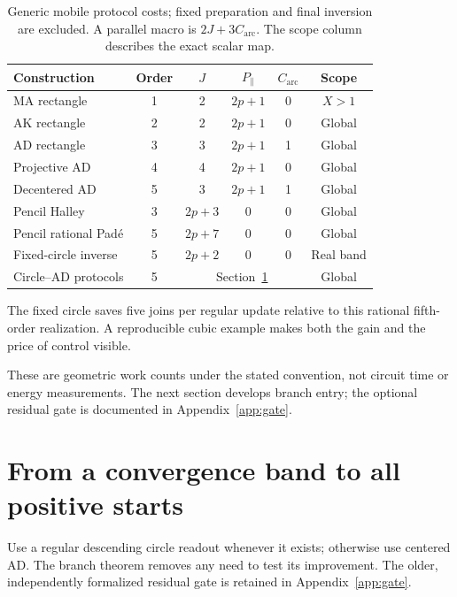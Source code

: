 \documentclass[11pt,a4paper]{article}
\begin{document}
\begin{table}[H]\centering\small
\caption{Generic mobile protocol costs; fixed preparation and final inversion are excluded. A parallel macro is $2J+3C_{\mathrm{arc}}$. The scope column describes the exact scalar map.}
\begin{tabularx}{\linewidth}{@{}Xccccc@{}}\toprule
Construction & Order & $J$ & $P_{\parallel}$ & $C_{\mathrm{arc}}$ & Scope\\\midrule
MA rectangle & 1 & 2 & $2p+1$ & 0 & $X>1$\\
AK rectangle & 2 & 2 & $2p+1$ & 0 & Global\\
AD rectangle & 3 & 3 & $2p+1$ & 1 & Global\\
Projective AD & 4 & 4 & $2p+1$ & 0 & Global\\
Decentered AD & 5 & 3 & $2p+1$ & 1 & Global\\
Pencil Halley & 3 & $2p+3$ & 0 & 0 & Global\\
Pencil rational Pad\'e & 5 & $2p+7$ & 0 & 0 & Global\\
Fixed-circle inverse & 5 & $2p+2$ & 0 & 0 & Real band\\
Circle--AD protocols & 5 & \multicolumn{3}{c}{Section~\ref{sec:safeguard}} & Global\\\bottomrule
\end{tabularx}
\end{table}
The fixed circle saves five joins per regular update relative to this rational fifth-order realization. A reproducible cubic example makes both the gain and the price of control visible.
\begin{table}[H]\centering\small
\caption{Steps / mobile joins to obtain $|s/a-1|\le10^{-d}$ from $p=3,X=2,s_0=3/4$, computed at 250 digits. The last two rows use binary residual caching and add 12 initial joins; every circle trial in this example is regular and accepted.}
\end{table}
These are geometric work counts under the stated convention, not circuit time or energy measurements. The next section develops branch entry; the optional residual gate is documented in Appendix~\ref{app:gate}.


\clearpage
\section{From a convergence band to all positive starts}\label{sec:safeguard}
Use a regular descending circle readout whenever it exists; otherwise use centered AD. The branch theorem removes any need to test its improvement. The older, independently formalized residual gate is retained in Appendix~\ref{app:gate}.
\end{document}
